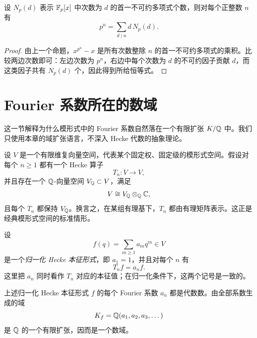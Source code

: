 \begin{corollary}
设 $N_p(d)$ 表示 $\mathbb{F}_p[x]$ 中次数为 $d$ 的首一不可约多项式个数，则对每个正整数 $n$ 有
\[
p^n=\sum_{d\mid n} d\,N_p(d).
\]
\end{corollary}

\begin{proof}
由上一个命题，$x^{p^n}-x$ 是所有次数整除 $n$ 的首一不可约多项式的乘积。比较两边次数即可：左边次数为 $p^n$，右边中每个次数为 $d$ 的不可约因子贡献 $d$，而这类因子共有 $N_p(d)$ 个，因此得到所给恒等式。
\end{proof}

\section{Fourier 系数所在的数域}

这一节解释为什么模形式中的 Fourier 系数自然落在一个有限扩张 $K/\mathbb{Q}$ 中。我们只使用本章的域扩张语言，不深入 Hecke 代数的抽象理论。

设 $V$ 是一个有限维复向量空间，代表某个固定权、固定级的模形式空间。假设对每个 $n\ge1$ 都有一个 Hecke 算子
\[
T_n:V\to V,
\]
并且存在一个 $\mathbb{Q}$-向量空间 $V_{\mathbb{Q}}\subset V$，满足
\[
V\cong V_{\mathbb{Q}}\otimes_{\mathbb{Q}}\mathbb{C},
\]
且每个 $T_n$ 都保持 $V_{\mathbb{Q}}$。换言之，在某组有理基下，$T_n$ 都由有理矩阵表示。这正是经典模形式空间的标准情形。

设
\[
f(q)=\sum_{m\ge1} a_m q^m\in V
\]
是一个\emph{归一化 Hecke 本征形式}，即 $a_1=1$，并且对每个 $n$ 有
\[
T_n f=a_n f.
\]
这里把 $a_n$ 同时看作 $T_n$ 对应的本征值；在归一化条件下，这两个记号是一致的。

\begin{theorem}
上述归一化 Hecke 本征形式 $f$ 的每个 Fourier 系数 $a_n$ 都是代数数。由全部系数生成的域
\[
K_f=\mathbb{Q}(a_1,a_2,a_3,\dots)
\]
是 $\mathbb{Q}$ 的一个有限扩张，因而是一个数域。
\end{theorem}

